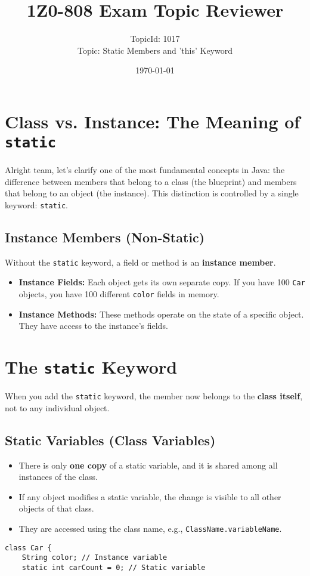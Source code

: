 \documentclass[12pt]{article}
\title{\textbf{1Z0-808 Exam Topic Reviewer}}
\author{TopicId: 1017 \\ Topic: Static Members and 'this' Keyword}
\date{\today}
\begin{document}
\maketitle
\newpage\begin{enumerate}[label=(\arabic*)]
\section*{Class vs. Instance: The Meaning of \texttt{static}}
Alright team, let's clarify one of the most fundamental concepts in Java: the difference between members that belong to a class (the blueprint) and members that belong to an object (the instance). This distinction is controlled by a single keyword: \texttt{static}.

\subsection*{Instance Members (Non-Static)}
Without the \texttt{static} keyword, a field or method is an \textbf{instance member}. 
\begin{itemize}
    \item \textbf{Instance Fields:} Each object gets its own separate copy. If you have 100 \texttt{Car} objects, you have 100 different \texttt{color} fields in memory.
    \item \textbf{Instance Methods:} These methods operate on the state of a specific object. They have access to the instance's fields.
\end{itemize}

\section{The \texttt{static} Keyword}
When you add the \texttt{static} keyword, the member now belongs to the \textbf{class itself}, not to any individual object.

\subsection*{Static Variables (Class Variables)}
\begin{itemize}
    \item There is only \textbf{one copy} of a static variable, and it is shared among all instances of the class.
    \item If any object modifies a static variable, the change is visible to all other objects of that class.
    \item They are accessed using the class name, e.g., \texttt{ClassName.variableName}.
\end{itemize}
\begin{verbatim}
class Car {
    String color; // Instance variable
    static int carCount = 0; // Static variable


\end{verbatim}
\end{enumerate}
\end{document}
